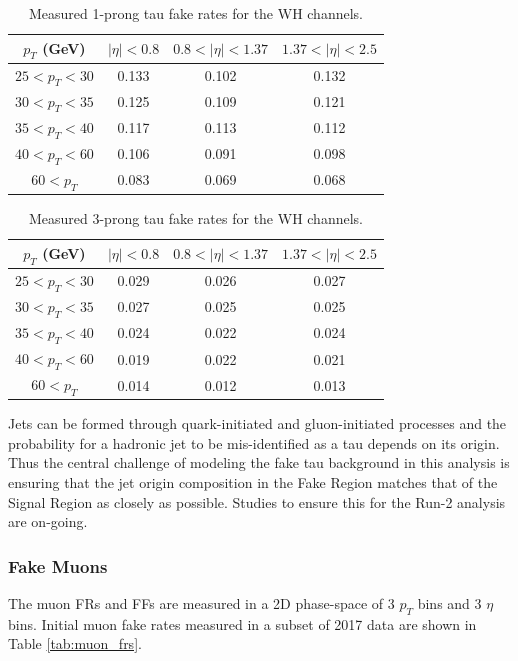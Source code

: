 \begin{table}[htb!]
    \centering
    \begin{tabular}{|c|c|c|c|}
    \hline
    $p_T$ (GeV) & $|\eta|<0.8$ & $0.8<|\eta|<1.37$ & $1.37<|\eta|<2.5$\\
    \hline
    $25<p_T<30$ & 0.133 & 0.102 & 0.132\\
    $30<p_T<35$ & 0.125 & 0.109 & 0.121\\
    $35<p_T<40$ & 0.117 & 0.113 & 0.112\\
    $40<p_T<60$ & 0.106 & 0.091 & 0.098\\
    $60<p_T$ & 0.083 & 0.069 & 0.068\\
    \hline
    \end{tabular}
    \caption{Measured 1-prong tau fake rates for the WH channels.}
    \label{tab:wh_1p_tau_frs}
\end{table}

\begin{table}[htb!]
    \centering
    \begin{tabular}{|c|c|c|c|}
    \hline
    $p_T$ (GeV) & $|\eta|<0.8$ & $0.8<|\eta|<1.37$ & $1.37<|\eta|<2.5$\\
    \hline
    $25<p_T<30$ & 0.029 & 0.026 & 0.027\\
    $30<p_T<35$ & 0.027 & 0.025 & 0.025\\
    $35<p_T<40$ & 0.024 & 0.022 & 0.024\\
    $40<p_T<60$ & 0.019 & 0.022 & 0.021\\
    $60<p_T$ & 0.014 & 0.012 & 0.013\\
    \hline
    \end{tabular}
    \caption{Measured 3-prong tau fake rates for the WH channels.}
    \label{tab:wh_3p_tau_frs}
\end{table}

\pagebreak

Jets can be formed through quark-initiated and gluon-initiated processes and the probability for a hadronic jet to be mis-identified as a tau depends on its origin. Thus the central challenge of modeling the fake tau background in this analysis is ensuring that the jet origin composition in the Fake Region matches that of the Signal Region as closely as possible. Studies to ensure this for the Run-2 analysis are on-going.\\ 

\subsubsection{Fake Muons}
The muon FRs and FFs are measured in a 2D phase-space of 3 $p_T$ bins and 3 $\eta$ bins. Initial muon fake rates measured in a subset of 2017 data are shown in Table \ref{tab:muon_frs}.

